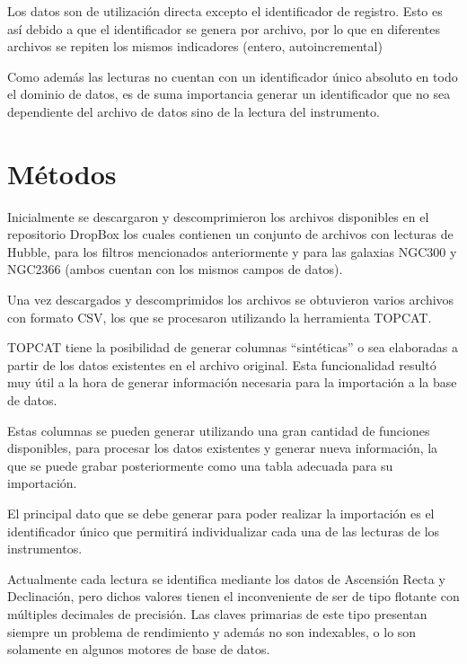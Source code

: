 \documentclass[a4paper,headsepline,footsepline,draft=false]{scrartcl}
\def\borrador{}
\begin{document}
Los datos son de utilización directa excepto el identificador de registro. Esto es así debido a que el identificador se genera por archivo, por lo que en diferentes archivos se repiten los mismos indicadores (entero, autoincremental)

Como además las lecturas no cuentan con un identificador único absoluto en todo el dominio de datos, es de suma importancia generar un identificador que no sea dependiente del archivo de datos sino de la lectura del instrumento.


\section{Métodos}

Inicialmente se descargaron y descomprimieron los archivos disponibles en el repositorio DropBox\cite{dropbox} los cuales contienen un conjunto de archivos con lecturas de Hubble, para los filtros mencionados anteriormente y para las galaxias NGC300 y NGC2366 (ambos cuentan con los mismos campos de datos).

Una vez descargados y descomprimidos los archivos se obtuvieron varios archivos con formato CSV, los que se procesaron utilizando la herramienta TOPCAT\cite{topcat}. 

TOPCAT tiene la posibilidad de generar columnas ``sintéticas'' o sea elaboradas a partir de los datos existentes en el archivo original. Esta funcionalidad resultó muy útil a la hora de generar información necesaria para la importación a la base de datos.

Estas columnas se pueden generar utilizando una gran cantidad de funciones disponibles, para procesar los datos existentes y generar nueva información, la que se puede grabar posteriormente como una tabla adecuada para su importación.

El principal dato que se debe generar para poder realizar la importación es el identificador único que permitirá individualizar cada una de las lecturas de los instrumentos.

Actualmente cada lectura se identifica mediante los datos de Ascensión Recta y Declinación, pero dichos valores tienen el inconveniente de ser de tipo flotante con múltiples decimales de precisión. Las claves primarias de este tipo presentan siempre un problema de rendimiento y además no son indexables, o lo son solamente en algunos motores de base de datos.
\end{document}
